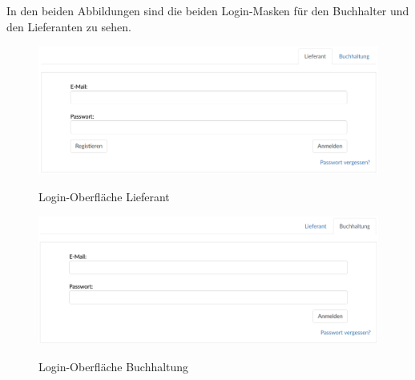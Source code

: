 \newpage
In den beiden Abbildungen sind die beiden Login-Masken für den Buchhalter und den Lieferanten zu sehen.
\begin{figure}[!h]
    \centering
    \includegraphics[width=17cm]{figures/loginmask.png}
    \label{fig:takebill}
    \caption{Login-Oberfläche Lieferant}
\end{figure}

\begin{figure}[!h]
    \centering
    \includegraphics[width=17cm]{figures/loginbuchmock.png}
    \label{fig:takebill}
    \caption{Login-Oberfläche Buchhaltung}
\end{figure}



